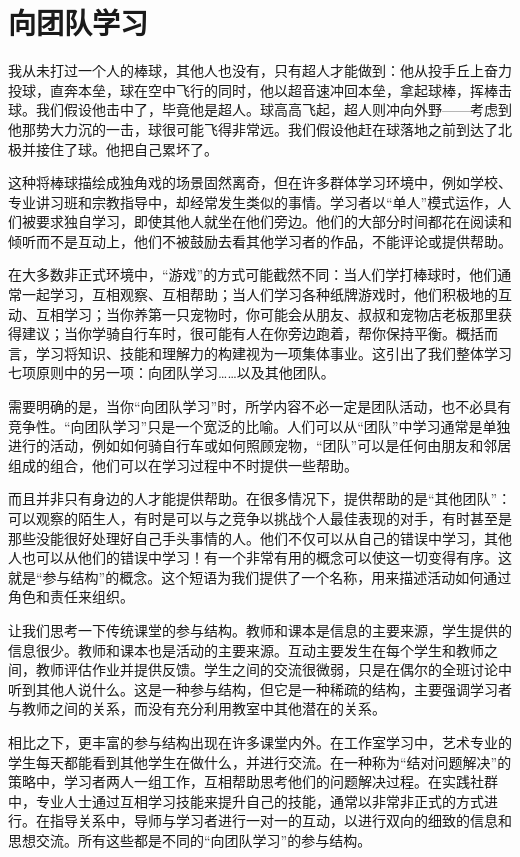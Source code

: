 \chapter{向团队学习}

我从未打过一个人的棒球，其他人也没有，只有超人才能做到：他从投手丘上奋力投球，直奔本垒，球在空中飞行的同时，他以超音速冲回本垒，拿起球棒，挥棒击球。我们假设他击中了，毕竟他是超人。球高高飞起，超人则冲向外野——考虑到他那势大力沉的一击，球很可能飞得非常远。我们假设他赶在球落地之前到达了北极并接住了球。他把自己累坏了。

这种将棒球描绘成独角戏的场景固然离奇，但在许多群体学习环境中，例如学校、专业讲习班和宗教指导中，却经常发生类似的事情。学习者以“单人”模式运作，人们被要求独自学习，即使其他人就坐在他们旁边。他们的大部分时间都花在阅读和倾听而不是互动上，他们不被鼓励去看其他学习者的作品，不能评论或提供帮助。

在大多数非正式环境中，“游戏”的方式可能截然不同：当人们学打棒球时，他们通常一起学习，互相观察、互相帮助；当人们学习各种纸牌游戏时，他们积极地的互动、互相学习；当你养第一只宠物时，你可能会从朋友、叔叔和宠物店老板那里获得建议；当你学骑自行车时，很可能有人在你旁边跑着，帮你保持平衡。概括而言，学习将知识、技能和理解力的构建视为一项集体事业。这引出了我们整体学习七项原则中的另一项：向团队学习……以及其他团队。

需要明确的是，当你“向团队学习”时，所学内容不必一定是团队活动，也不必具有竞争性。“向团队学习”只是一个宽泛的比喻。人们可以从“团队”中学习通常是单独进行的活动，例如如何骑自行车或如何照顾宠物，“团队”可以是任何由朋友和邻居组成的组合，他们可以在学习过程中不时提供一些帮助。

而且并非只有身边的人才能提供帮助。在很多情况下，提供帮助的是“其他团队”：可以观察的陌生人，有时是可以与之竞争以挑战个人最佳表现的对手，有时甚至是那些没能很好处理好自己手头事情的人。他们不仅可以从自己的错误中学习，其他人也可以从他们的错误中学习！有一个非常有用的概念可以使这一切变得有序。这就是“参与结构”的概念。这个短语为我们提供了一个名称，用来描述活动如何通过角色和责任来组织。

让我们思考一下传统课堂的参与结构。教师和课本是信息的主要来源，学生提供的信息很少。教师和课本也是活动的主要来源。互动主要发生在每个学生和教师之间，教师评估作业并提供反馈。学生之间的交流很微弱，只是在偶尔的全班讨论中听到其他人说什么。这是一种参与结构，但它是一种稀疏的结构，主要强调学习者与教师之间的关系，而没有充分利用教室中其他潜在的关系。

相比之下，更丰富的参与结构出现在许多课堂内外。在工作室学习中，艺术专业的学生每天都能看到其他学生在做什么，并进行交流。在一种称为“结对问题解决”的策略中，学习者两人一组工作，互相帮助思考他们的问题解决过程。在实践社群中，专业人士通过互相学习技能来提升自己的技能，通常以非常非正式的方式进行。在指导关系中，导师与学习者进行一对一的互动，以进行双向的细致的信息和思想交流。所有这些都是不同的“向团队学习”的参与结构。

